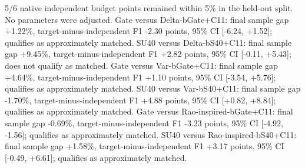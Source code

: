 5/6 native independent budget points remained within 5\% in the held-out split. No parameters were adjusted. Gate versus Delta-bGate+C11: final sample gap +1.22\%, target-minus-independent F1 -2.30 points, 95\% CI [-6.24, +1.52]; qualifies as approximately matched. SU40 versus Delta-bS40+C11: final sample gap +9.45\%, target-minus-independent F1 +2.82 points, 95\% CI [-0.11, +5.43]; does not qualify as matched. Gate versus Var-bGate+C11: final sample gap +4.64\%, target-minus-independent F1 +1.10 points, 95\% CI [-3.54, +5.76]; qualifies as approximately matched. SU40 versus Var-bS40+C11: final sample gap -1.70\%, target-minus-independent F1 +4.88 points, 95\% CI [+0.82, +8.84]; qualifies as approximately matched. Gate versus Rao-inspired-bGate+C11: final sample gap -0.69\%, target-minus-independent F1 -3.23 points, 95\% CI [-4.92, -1.56]; qualifies as approximately matched. SU40 versus Rao-inspired-bS40+C11: final sample gap +1.58\%, target-minus-independent F1 +3.17 points, 95\% CI [-0.49, +6.61]; qualifies as approximately matched.
